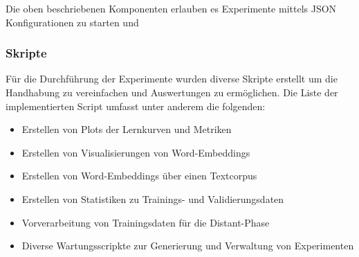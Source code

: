 Die oben beschriebenen Komponenten erlauben es Experimente mittels JSON Konfigurationen zu starten und 

\subsubsection{Skripte}
Für die Durchführung der Experimente wurden diverse Skripte erstellt um die Handhabung zu vereinfachen und Auswertungen zu ermöglichen. Die Liste der implementierten Script umfasst unter anderem die folgenden:

\begin{itemize}[noitemsep]
	\item Erstellen von Plots der Lernkurven und Metriken
	\item Erstellen von Visualisierungen von Word-Embeddings
	\item Erstellen von Word-Embeddings über einen Textcorpus
	\item Erstellen von Statistiken zu Trainings- und Validierungsdaten
	\item Vorverarbeitung von Trainingsdaten für die Distant-Phase
	\item Diverse Wartungsscripkte zur Generierung und Verwaltung von Experimenten
\end{itemize}

